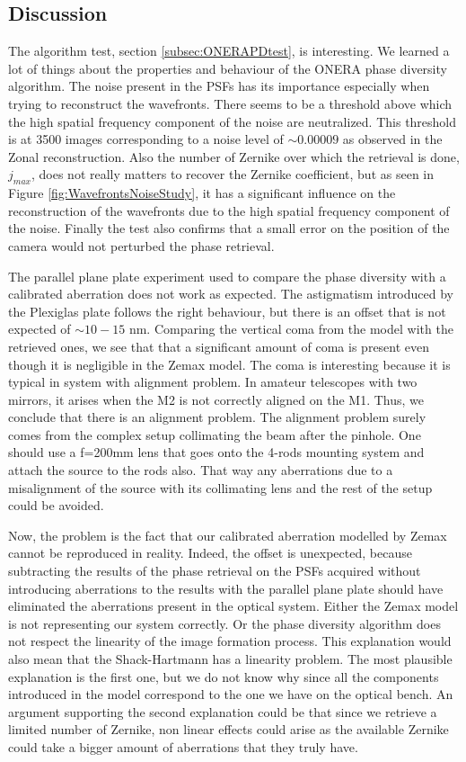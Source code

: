 \subsection{Discussion}
\label{subsec:DiscussionOnera}

The algorithm test, section \ref{subsec:ONERAPDtest}, is interesting. We learned a lot of things about the properties and behaviour of the ONERA phase diversity algorithm. The noise present in the PSFs has its importance especially when trying to reconstruct the wavefronts. There seems to be a threshold above which the high spatial frequency component of the noise are neutralized. This threshold is at 3500 images corresponding to a noise level of $\sim0.00009$ as observed in the Zonal reconstruction. Also the number of Zernike over which the retrieval is done, $j_{max}$, does not really matters to recover the Zernike coefficient, but as seen in Figure \ref{fig:WavefrontsNoiseStudy}, it has a significant influence on the reconstruction of the wavefronts due to the high spatial frequency component of the noise. Finally the test also confirms that a small error on the position of the camera would not perturbed the phase retrieval. 

The parallel plane plate experiment used to compare the phase diversity with a calibrated aberration does not work as expected. The astigmatism introduced by the Plexiglas plate follows the right behaviour, but there is an offset that is not expected of $\sim 10-15$ nm. Comparing the vertical coma from the model with the retrieved ones, we see that that a significant amount of coma is present even though it is negligible in the Zemax model. The coma is interesting because it is typical in system with alignment problem. In amateur telescopes with two mirrors, it arises when the M2 is not correctly aligned on the M1. Thus, we conclude that there is an alignment problem. The alignment problem surely comes from the complex setup collimating the beam after the pinhole. One should use a f=200mm lens that goes onto the 4-rods mounting system and attach the source to the rods also. That way any aberrations due to a misalignment of the source with its collimating lens and the rest of the setup could be avoided.

Now, the problem is the fact that our calibrated aberration modelled by Zemax cannot be reproduced in reality. Indeed, the offset is unexpected, because subtracting the results of the phase retrieval on the PSFs acquired without introducing aberrations to the results with the parallel plane plate should have eliminated the aberrations present in the optical system.  Either the Zemax model is not representing our system correctly. Or the phase diversity algorithm does not respect the linearity of the image formation process. This explanation would also mean that the Shack-Hartmann has a linearity problem. The most plausible explanation is the first one, but we do not know why since all the components introduced in the model correspond to the one we have on the optical bench. An argument supporting the second explanation could be that since we retrieve a limited number of Zernike, non linear effects could arise as the available Zernike could take a bigger amount of aberrations that they truly have.

